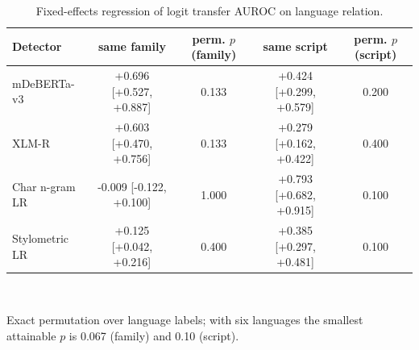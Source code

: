 \begin{table}[t]
\centering
\small
\caption{Fixed-effects regression of logit transfer AUROC on language relation.}
\label{tab:famscript}
\begin{tabular}{lcccc}
\toprule
Detector & same family & perm. $p$ (family) & same script & perm. $p$ (script) \\
\midrule
mDeBERTa-v3 & +0.696 [+0.527, +0.887] & 0.133 & +0.424 [+0.299, +0.579] & 0.200 \\
XLM-R & +0.603 [+0.470, +0.756] & 0.133 & +0.279 [+0.162, +0.422] & 0.400 \\
Char n-gram LR & -0.009 [-0.122, +0.100] & 1.000 & +0.793 [+0.682, +0.915] & 0.100 \\
Stylometric LR & +0.125 [+0.042, +0.216] & 0.400 & +0.385 [+0.297, +0.481] & 0.100 \\
\bottomrule
\end{tabular}
\\[2pt]\parbox{\linewidth}{\footnotesize Exact permutation over language labels; with six languages the smallest attainable $p$ is 0.067 (family) and 0.10 (script).}
\end{table}